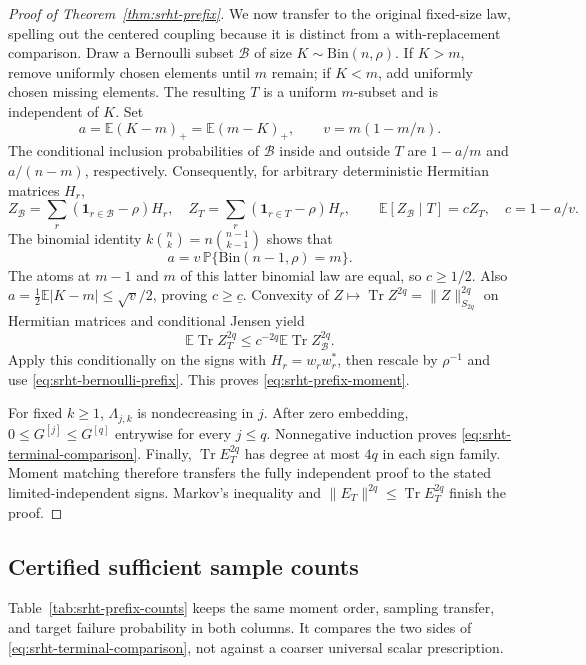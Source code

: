 \documentclass[11pt,a4paper]{article}
\theoremstyle{definition}\newtheorem{definition}[theorem]{Definition}
\theoremstyle{remark}\newtheorem{remark}[theorem]{Remark}
\newcommand{\E}{\mathbb E}\newcommand{\Prob}{\mathbb P}
\newcommand{\Tr}{\operatorname{Tr}}\newcommand{\tr}{\operatorname{Tr}}
\newcommand{\norm}[1]{\lVert#1\rVert}\newcommand{\ip}[2]{\langle#1,#2\rangle}
\numberwithin{equation}{section}
\begin{document}
\begin{proof}[Proof of Theorem~\ref{thm:srht-prefix}]
We now transfer to the original fixed-size law, spelling out the centered
coupling because it is distinct from a with-replacement comparison. Draw
a Bernoulli subset $\mathcal B$ of size $K\sim\mathrm{Bin}(n,\rho)$.
If $K>m$, remove uniformly chosen elements until $m$ remain; if $K<m$,
add uniformly chosen missing elements. The resulting $T$ is a uniform
$m$-subset and is independent of $K$. Set
\[
 a=\E(K-m)_+=\E(m-K)_+,\qquad v=m(1-m/n).
\]
The conditional inclusion probabilities of $\mathcal B$ inside and
outside $T$ are $1-a/m$ and $a/(n-m)$, respectively. Consequently, for
arbitrary deterministic Hermitian matrices $H_r$,
\[
 Z_{\mathcal B}=\sum_r(\mathbf1_{r\in\mathcal B}-\rho)H_r,
 \quad Z_T=\sum_r(\mathbf1_{r\in T}-\rho)H_r,
 \qquad
 \E[Z_{\mathcal B}\mid T]=cZ_T,
 \quad c=1-a/v.
\]
The binomial identity $k\binom nk=n\binom{n-1}{k-1}$ shows that
\[
 a=v\,\mathbb P\{\mathrm{Bin}(n-1,\rho)=m\}.
\]
The atoms at $m-1$ and $m$ of this latter binomial law are equal, so
$c\ge1/2$. Also
$a=\frac12\E|K-m|\le\sqrt v/2$, proving $c\ge\underline c$.
Convexity of $Z\mapsto\Tr Z^{2q}=\norm{Z}_{S_{2q}}^{2q}$ on Hermitian
matrices and conditional Jensen yield
\[
 \E\Tr Z_T^{2q}\le c^{-2q}\E\Tr Z_{\mathcal B}^{2q}.
\]
Apply this conditionally on the signs with $H_r=w_rw_r^*$, then rescale
by $\rho^{-1}$ and use \eqref{eq:srht-bernoulli-prefix}. This proves
\eqref{eq:srht-prefix-moment}.

For fixed $k\ge1$, $\Lambda_{j,k}$ is nondecreasing in $j$. After zero
embedding, $0\le G^{[j]}\le G^{[q]}$ entrywise for every $j\le q$.
Nonnegative induction proves \eqref{eq:srht-terminal-comparison}.
Finally, $\Tr E_T^{2q}$ has degree at most $4q$ in each sign family.
Moment matching therefore transfers the fully independent proof to the
stated limited-independent signs. Markov's inequality and
$\norm{E_T}^{2q}\le\Tr E_T^{2q}$ finish the proof.
\end{proof}

\subsection{Certified sufficient sample counts}

Table~\ref{tab:srht-prefix-counts} keeps the same moment order, sampling
transfer, and target failure probability in both columns. It compares
the two sides of \eqref{eq:srht-terminal-comparison}, not against a
coarser universal scalar prescription.
\end{document}

